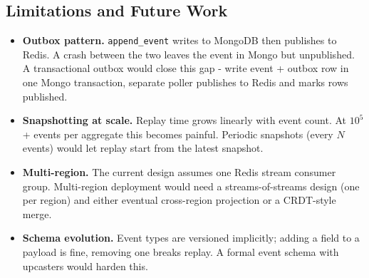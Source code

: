 \documentclass[11pt,a4paper]{article}
\newcommand{\code}[1]{\texttt{\small #1}}
\begin{document}



\subsection{Limitations and Future Work}

\begin{itemize}
  \item \textbf{Outbox pattern.} \code{append\_event} writes to MongoDB then publishes to Redis. A crash between the two leaves the event in Mongo but unpublished. A transactional outbox would close this gap - write event + outbox row in one Mongo transaction, separate poller publishes to Redis and marks rows published.
  \item \textbf{Snapshotting at scale.} Replay time grows linearly with event count. At $10^5$+ events per aggregate this becomes painful. Periodic snapshots (every $N$ events) would let replay start from the latest snapshot.
  \item \textbf{Multi-region.} The current design assumes one Redis stream consumer group. Multi-region deployment would need a streams-of-streams design (one per region) and either eventual cross-region projection or a CRDT-style merge.
  \item \textbf{Schema evolution.} Event types are versioned implicitly; adding a field to a payload is fine, removing one breaks replay. A formal event schema with upcasters would harden this.
\end{itemize}
\end{document}
